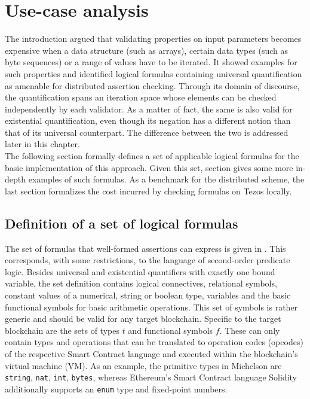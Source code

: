 \chapter{Use-case analysis}\label{chap:use_cases}
The introduction argued that validating properties on input parameters becomes expensive when a data structure (such as arrays), certain data types (such as byte sequences) or a range of values have to be iterated. It showed examples for such properties and identified logical formulas containing universal quantification as amenable for distributed assertion checking. Through its domain of discourse, the quantification spans an iteration space whose elements can be checked independently by each validator. As a matter of fact, the same is also valid for existential quantification, even though its negation has a different notion than that of its universal counterpart. The difference between the two is addressed later in this chapter. \\
The following section formally defines a set of applicable logical formulas for the basic implementation of this approach. Given this set, section  gives some more in-depth examples of such formulas. As a benchmark for the distributed scheme, the last section formalizes the cost incurred by checking formulas on Tezos locally.

\section{Definition of a set of logical formulas}\label{sec:formulae}
The set of formulas that well-formed assertions can express is given in . This corresponds, with some restrictions, to the language of second-order predicate logic. Besides universal and existential quantifiers with exactly one bound variable, the set definition contains logical connectives, relational symbols, constant values of a numerical, string or boolean type, variables and the basic functional symbols for basic arithmetic operations. This set of symbols is rather generic and should be valid for any target blockchain. Specific to the target blockchain are the sets of types $t$ and functional symbols $f$. These can only contain types and operations that can be translated to operation codes (opcodes) of the respective Smart Contract language and executed within the blockchain's virtual machine (VM). As an example, the primitive types in Michelson are \texttt{string}, \texttt{nat}, \texttt{int}, \texttt{bytes}, whereas Ethereum's Smart Contract language Solidity  \cite{solidity_docs} additionally supports an \texttt{enum} type and fixed-point numbers.

